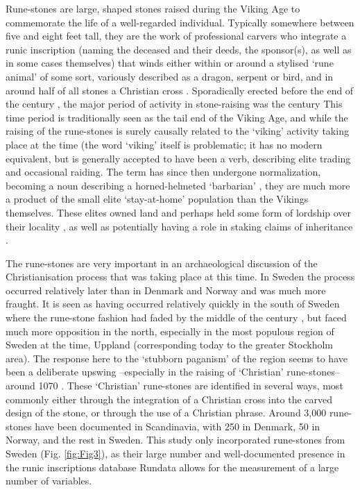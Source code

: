 Rune-stones are large, shaped stones raised during the Viking Age to commemorate the life of a well-regarded individual. Typically somewhere between five and eight feet tall, they are the work of professional carvers who integrate a runic inscription (naming the deceased and their deeds, the sponsor(s), as well as in some cases themselves) that winds either within or around a stylised ‘rune animal’ of some sort, variously described as a dragon, serpent or bird, and in around half of all stones a Christian cross \parencite[10]{Sawyer_2000}. Sporadically erected before the end of the  century \AD, the major period of activity in stone-raising was the  century \AD This time period is traditionally seen as the tail end of the Viking Age, and while the raising of the rune-stones is surely causally related to the ‘viking’ activity taking place at the time (the word ‘viking’ itself is problematic; it has no modern equivalent, but is generally accepted to have been a verb, describing elite trading and occasional raiding. The term has since then undergone normalization, becoming a noun describing a horned-helmeted ‘barbarian’ \parencite[56]{Jesch_2001}, they are much more a product of the small elite ‘stay-at-home’ population than the Vikings themselves. These elites owned land and perhaps held some form of lordship over their locality \parencite[36--41]{Jesch_2001}, as well as potentially having a role in staking claims of inheritance \parencite[74--91]{Sawyer_2000}.

The rune-stones are very important in an archaeological discussion of the Christianisation process that was taking place at this time. In Sweden the process occurred relatively later than in Denmark and Norway and was much more fraught. It is seen as having occurred relatively quickly in the south of Sweden where the rune-stone fashion had faded by the middle of the  century \parencite[501]{Lager_2010}, but faced much more opposition in the north, especially in the most populous region of Sweden at the time, Uppland (corresponding today to the greater Stockholm area). The response here to the ‘stubborn paganism’ of the region \parencite[39]{Herschend_1994} seems to have been a deliberate upswing –especially in the raising of ‘Christian’ rune-stones– around 1070 \parencite[501]{Lager_2010}. These ‘Christian’ rune-stones are identified in several ways, most commonly either through the integration of a Christian cross into the carved design of the stone, or through the use of a Christian phrase. Around 3,000 rune-stones have been documented in Scandinavia, with 250 in Denmark, 50 in Norway, and the rest in Sweden. This study only incorporated rune-stones from Sweden (Fig. \ref{fig:Fig3}), as their large number and well-documented presence in the runic inscriptions database Rundata allows for the measurement of a large number of variables.

